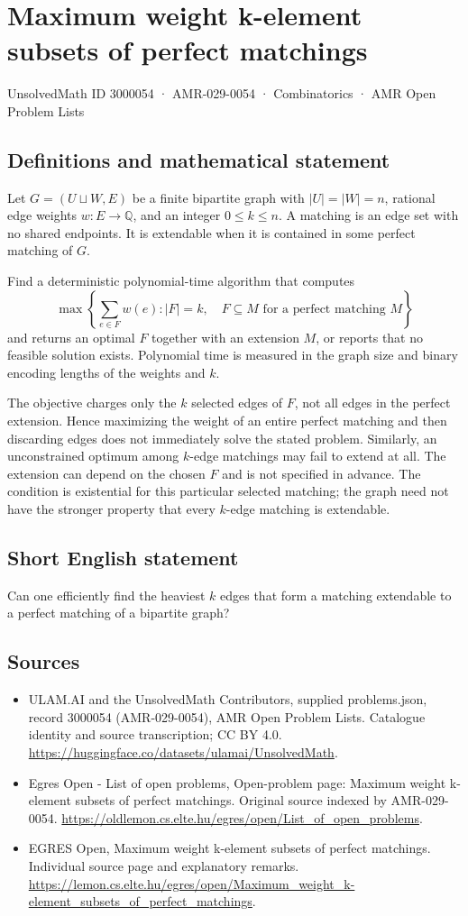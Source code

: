 \documentclass[11pt,a4paper]{article}
\begin{document}
\section*{Maximum weight k-element subsets of perfect matchings}\label{3000054}
{\small UnsolvedMath ID 3000054 · AMR-029-0054 · Combinatorics · AMR Open Problem Lists}
\subsection{Definitions and mathematical statement}
Let $G=(U\sqcup W,E)$ be a finite bipartite graph with $|U|=|W|=n$,
rational edge weights $w:E\to\mathbb Q$, and an integer $0\le k\le n$.
A matching is an edge set with no shared endpoints. It is extendable
when it is contained in some perfect matching of $G$.

Find a deterministic polynomial-time algorithm that computes
\[
       \max\left\{\sum_{e\in F}w(e):|F|=k,\quad
                     F\subseteq M\text{ for a perfect matching }M\right\}
\]
and returns an optimal $F$ together with an extension $M$, or reports
that no feasible solution exists. Polynomial time is measured in the
graph size and binary encoding lengths of the weights and $k$.

The objective charges only the $k$ selected edges of $F$, not all
edges in the perfect extension. Hence maximizing the weight of an
entire perfect matching and then discarding edges does not immediately
solve the stated problem. Similarly, an unconstrained optimum among
$k$-edge matchings may fail to extend at all. The extension can depend
on the chosen $F$ and is not specified in advance. The condition is
existential for this particular selected matching; the graph need not
have the stronger property that every $k$-edge matching is extendable.
\subsection{Short English statement}
Can one efficiently find the heaviest $k$ edges that form a
matching extendable to a perfect matching of a bipartite graph?
\subsection{Sources}
\begin{itemize}
\item[S1] ULAM.AI and the UnsolvedMath Contributors, supplied problems.json, record 3000054 (AMR-029-0054), AMR Open Problem Lists. Catalogue identity and source transcription; CC BY 4.0.
\url{https://huggingface.co/datasets/ulamai/UnsolvedMath}.
\item[S2] Egres Open - List of open problems, Open-problem page: Maximum weight k-element subsets of perfect matchings. Original source indexed by AMR-029-0054.
\url{https://oldlemon.cs.elte.hu/egres/open/List_of_open_problems}.
\item[S3] EGRES Open, Maximum weight k-element subsets of perfect matchings. Individual source page and explanatory remarks.
\url{https://lemon.cs.elte.hu/egres/open/Maximum_weight_k-element_subsets_of_perfect_matchings}.
\end{itemize}
\end{document}
